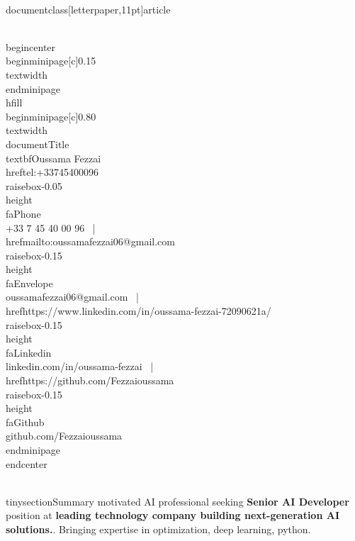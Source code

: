 \\documentclass[letterpaper,11pt]{article}
\begin{document}
\\begin{center}
  \\begin{minipage}[c]{0.15\\textwidth}
  \\end{minipage}\\hfill
  \\begin{minipage}[c]{0.80\\textwidth}
    \\documentTitle{\\textbf{Oussama Fezzai}}{
      \\href{tel:+33745400096}{\\raisebox{-0.05\\height}\\faPhone\\ +33 7 45 40 00 96} ~|~
      \\href{mailto:oussamafezzai06@gmail.com}{\\raisebox{-0.15\\height}\\faEnvelope\\ oussamafezzai06@gmail.com} ~|~
      \\href{https://www.linkedin.com/in/oussama-fezzai-72090621a/}{\\raisebox{-0.15\\height}\\faLinkedin\\ linkedin.com/in/oussama-fezzai} ~|~
      \\href{https://github.com/Fezzaioussama}{\\raisebox{-0.15\\height}\\faGithub\\ github.com/Fezzaioussama}
    }
  \\end{minipage}
\\end{center}

\\tinysection{Summary}
\Highly motivated AI professional seeking \textbf{Senior AI Developer} position at \textbf{leading technology company building next-generation AI solutions.}. Bringing expertise in optimization, deep learning, python.
\end{document}
